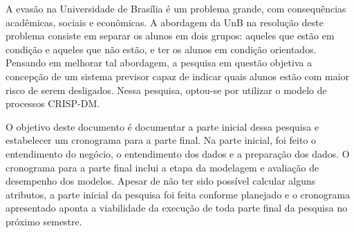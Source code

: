 A evasão na Universidade de Brasília é um problema grande, com consequências
acadêmicas, sociais e econômicas. A abordagem da UnB na resolução deste problema
consiste em separar os alunos em dois grupos: aqueles que estão em condição e
aqueles que não estão, e ter os alunos em condição orientados. Pensando em melhorar
tal abordagem, a pesquisa em questão objetiva a concepção de um sistema previsor
capaz de indicar quais alunos estão com maior risco de serem desligados. Nessa
pesquisa, optou-se por utilizar o modelo de processos CRISP-DM. 

O objetivo deste documento é documentar a parte inicial dessa pesquisa e estabelecer
um cronograma para a parte final. Na parte inicial, foi feito o entendimento do
negócio, o entendimento dos dados e a preparação dos dados. O cronograma para a
parte final inclui a etapa da modelagem e avaliação de desempenho dos modelos.
Apesar de não ter sido possível calcular alguns atributos, a parte inicial da
pesquisa foi feita conforme planejado e o cronograma apresentado aponta a
viabilidade da execução de toda parte final da pesquisa no próximo semestre.  
